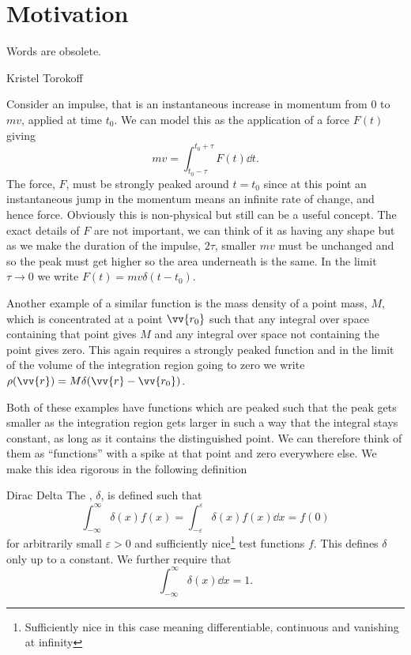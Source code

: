 \documentclass[fleqn]{NotesClass}
\begin{document}
    \section{Motivation}
    \epigraph{Words are obsolete.}{Kristel Torokoff}
    Consider an impulse, that is an instantaneous increase in momentum from 0 to \(mv\), applied at time \(t_0\).
    We can model this as the application of a force \(F(t)\) giving
    \begin{equation}
        mv = \int_{t_0-\tau}^{t_0 + \tau} F(t) \dd{t}.
    \end{equation}
    The force, \(F\), must be strongly peaked around \(t = t_0\) since at this point an instantaneous jump in the momentum means an infinite rate of change, and hence force.
    Obviously this is non-physical but still can be a useful concept.
    The exact details of \(F\) are not important, we can think of it as having any shape but as we make the duration of the impulse, \(2\tau\), smaller \(mv\) must be unchanged and so the peak must get higher so the area underneath is the same.
    In the limit \(\tau \to 0\) we write \(F(t) = mv\delta(t - t_0)\).
    
    Another example of a similar function is the mass density of a point mass, \(M\), which is concentrated at a point \(\vv{r_0}\) such that any integral over space containing that point gives \(M\) and any integral over space not containing the point gives zero.
    This again requires a strongly peaked function and in the limit of the volume of the integration region going to zero we write \(\rho(\vv{r}) = M\delta(\vv{r} - \vv{r_0})\).
    
    Both of these examples have functions which are peaked such that the peak gets smaller as the integration region gets larger in such a way that the integral stays constant, as long as it contains the distinguished point.
    We can therefore think of them as \enquote{functions} with a spike at that point and zero everywhere else.
    We make this idea rigorous in the following definition
    
    \begin{dfn}{Dirac Delta}{}
        The , \(\delta\), is defined such that
        \begin{equation}
            \int_{-\infty}^{\infty} \delta(x) f(x) = \int_{-\varepsilon}^{\varepsilon} \delta(x)f(x) \dd{x} = f(0)
        \end{equation}
        for arbitrarily small \(\varepsilon > 0\) and sufficiently nice\footnote{Sufficiently nice in this case meaning differentiable, continuous and vanishing at infinity} test functions \(f\).
        This defines \(\delta\) only up to a constant.
        We further require that
        \begin{equation}
            \int_{-\infty}^{\infty} \delta(x) \dd{x} = 1.
        \end{equation}
    \end{dfn}
    
\end{document}
